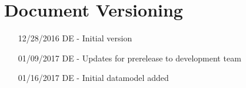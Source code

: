 \chapter*{Document Versioning}
\begin{enumerate}
    \item[12/28/2016] DE - Initial version
    \item[01/09/2017] DE - Updates for prerelease to development team
    \item[01/16/2017] DE - Initial datamodel added
\end{enumerate}